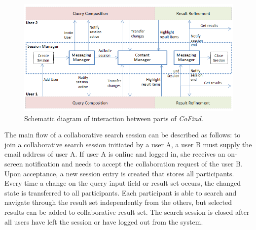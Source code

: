 \documentclass[runningheads,a4paper]{llncs} \usepackage[utf8]{inputenc}
\begin{document}
\begin{figure}[h!]
  \centering
    \includegraphics[width=0.75\linewidth]{resources/cofind-workflow.png}
  \caption{Schematic diagram of interaction between parts of \emph{CoFind}.}
  \label{fig:cofind}
\end{figure}
 
The main flow of a collaborative search session can be described as follows: to join a collaborative search session initiated by a user A, a user B must supply the email address of user A. If user A is online and logged in, she receives an on-screen notification and needs to accept the collaboration request of the user B. Upon acceptance, a new session entry is created that stores all participants. Every time a change on the query input field or result set occurs, the changed state is transferred to all participants. Each participant is able to search and navigate through the result set independently from the others, but selected results can be added to collaborative result set. The search session is closed after all users have left the session or have logged out from the system.
\end{document}
